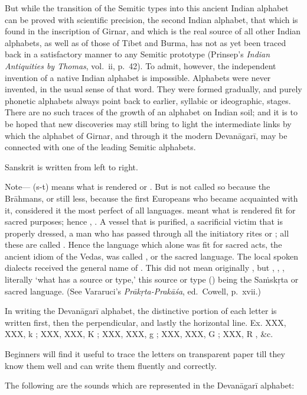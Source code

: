 \begin{note}
  But while the transition of the Semitic types into this ancient Indian
  alphabet can be proved with scientific precision, the second Indian
  alphabet, that which is found in the inscription of Girnar, and which
  is the real source of all other Indian alphabets, as well as of those
  of Tibet and Burma, has not as yet been traced back in a satisfactory
  manner to any Semitic prototype (Prinsep's \emph{Indian Antiquities by
  Thomas}, vol.\ ii, p.\ 42). To admit, however, the independent
  invention of a native Indian alphabet is impossible. Alphabets were
  never invented, in the usual sense of that word. They were formed
  gradually, and purely phonetic alphabets always point back to earlier,
  syllabic or ideographic, stages. There are no such traces of the
  growth of an alphabet on Indian soil; and it is to be hoped that new
  discoveries may still bring to light the intermediate links by which
  the alphabet of Girnar, and through it the modern Devanāgarī, may be
  connected with one of the leading Semitic alphabets.
\end{note}

\s Sanskrit is written from left to right.

\begin{note}
  Note— ({\dn s\2-t}) means what is rendered  or
  . But  is not called so because the
  Brāhmans, or still less, because the first Europeans who became
  acquainted with it, considered it the most perfect of all languages.
   meant what is rendered fit for sacred purposes; hence
  , . A vessel that is purified, a sacrificial
  victim that is properly dressed, a man who has passed through all the
  initiatory rites or ; all these are called
  . Hence the language which alone was fit for sacred acts,
  the ancient idiom of the Vedas, was called , or the
  sacred language. The local spoken dialects received the general name
  of . This did not mean originally , but
  , , , literally `what has
  a source or type,' this source or type () being the
  Saṁskṛta or sacred language. (See Vararuci's \emph{Prākṛta-Prakāśa},
  ed.\ Cowell, p.\ xvii.)
\end{note}

\s In writing the Devanāgarī alphabet, the distinctive portion of each
letter is written first, then the perpendicular, and lastly the
horizontal line. Ex. XXX, XXX, {\dn k} ; XXX, XXX, {\dn K} ;
XXX, XXX, {\dn g} ; XXX, XXX, {\dn G} ; XXX, {\dn R} , \&c.

Beginners will find it useful to trace the letters on transparent paper
till they know them well and can write them fluently and correctly.

\s The following are the sounds which are represented in the Devanāgarī
alphabet:

